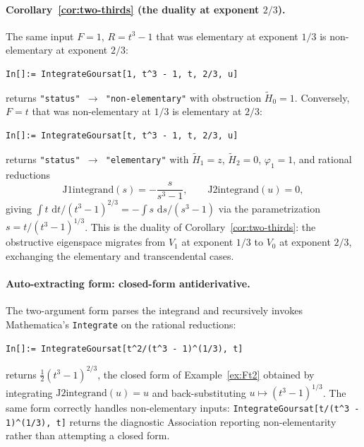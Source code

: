 \documentclass[11pt,a4paper]{article}
\theoremstyle{plain}
\theoremstyle{definition}
\theoremstyle{remark}
\renewcommand{\d}{\,\mathrm{d}}
\begin{document}
\paragraph{Corollary~\ref{cor:two-thirds} (the duality at exponent $2/3$).} The same input $F=1$, $R=t^3-1$ that was elementary at exponent $1/3$ is non-elementary at exponent $2/3$:
\begin{lstlisting}[basicstyle=\footnotesize\ttfamily,frame=none]
In[]:= IntegrateGoursat[1, t^3 - 1, t, 2/3, u]
\end{lstlisting}
returns \texttt{"status"\,$\to$\,"non-elementary"} with obstruction $\widetilde H_0 = 1$. Conversely, $F=t$ that was non-elementary at $1/3$ is elementary at $2/3$:
\begin{lstlisting}[basicstyle=\footnotesize\ttfamily,frame=none]
In[]:= IntegrateGoursat[t, t^3 - 1, t, 2/3, u]
\end{lstlisting}
returns \texttt{"status"\,$\to$\,"elementary"} with $\widetilde H_1 = z$, $\widetilde H_2 = 0$, $\varphi_1 = 1$, and rational reductions
\[
  \text{J1integrand}(s) = -\frac{s}{s^3-1},\qquad \text{J2integrand}(u) = 0,
\]
giving $\int t\,\d t/(t^3-1)^{2/3} = -\int s\,\d s/(s^3-1)$ via the parametrization $s = t/(t^3-1)^{1/3}$. This is the duality of Corollary~\ref{cor:two-thirds}: the obstructive eigenspace migrates from $V_1$ at exponent $1/3$ to $V_0$ at exponent $2/3$, exchanging the elementary and transcendental cases.

\medskip
\noindent
\paragraph{Auto-extracting form: closed-form antiderivative.} The two-argument form parses the integrand and recursively invokes Mathematica's \texttt{Integrate} on the rational reductions:
\begin{lstlisting}[basicstyle=\footnotesize\ttfamily,frame=none]
In[]:= IntegrateGoursat[t^2/(t^3 - 1)^(1/3), t]
\end{lstlisting}
returns $\tfrac{1}{2}(t^3-1)^{2/3}$, the closed form of Example~\ref{ex:Ft2} obtained by integrating $\text{J2integrand}(u) = u$ and back-substituting $u\mapsto (t^3-1)^{1/3}$. The same form correctly handles non-elementary inputs: \texttt{IntegrateGoursat[t/(t\textasciicircum 3 - 1)\textasciicircum(1/3), t]} returns the diagnostic Association reporting non-elementarity rather than attempting a closed form.
\end{document}
